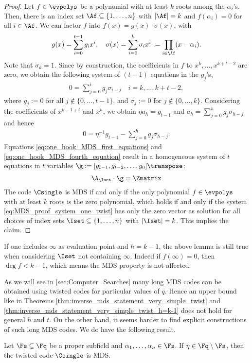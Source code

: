 \documentclass[conference,a4paper]{IEEEtran}
\begin{document}
\begin{proof}
Let $f \in \evpolys$ be a polynomial with at least $k$ roots among the $\alpha_i$'s.
Then, there is an index set $\Af \subseteq \{1,\dots,n\}$ with $|\Af|=k$ and $f(\alpha_i) = 0$ for all $i \in \Af$.
We can factor $f$ into $f(x) = g(x) \cdot \sigma(x)$, with
\begin{align*}
g(x) = \sum\limits_{i=0}^{t-1} g_i x^i, \quad
\sigma(x) = \sum\limits_{i=0}^{k} \sigma_i x^i := \prod_{i \in \Af} (x-\alpha_i).
\end{align*}
Note that $\sigma_k=1$.
Since by construction, the coefficients in $f$ to $x^k, \ldots, x^{k+t-2}$ are zero, we obtain the following system of $(t-1)$ equations in the $g_j$'s,
\begin{align}
0 = \sum\limits_{j=0}^{i} g_j \sigma_{i-j} \quad i=k,\dots,k+t-2, \label{eq:one_hook_MDS_first_equations}
\end{align}
where $g_j := 0$ for all $j \notin \{ 0,\ldots, t-1 \}$, and $\sigma_j:=0$ for $j \notin \{0,\ldots,k\}$.
Considering the coefficients of $x^{k-1+t}$ and $x^h$, we obtain
$\eta a_h   = g_{t-1}$ and $a_h  = \sum_{j=0}^{h} g_j \sigma_{h-j}$
and hence
\begin{align}
0 = \eta^{-1} g_{t-1} -\sum\limits_{j=0}^{h} g_j \sigma_{h-j}. \label{eq:one_hook_MDS_fourth_equation}
\end{align}
Equations \eqref{eq:one_hook_MDS_first_equations} and \eqref{eq:one_hook_MDS_fourth_equation} result in a homogeneous system of $t$ equations in $t$ variables $\g := [g_{t-1},g_{t-2},\dots,g_{0}]\transpose$:
\begin{align}
\A_\Iset \cdot \g
=
\Zmatrix \label{eq:MDS_proof_system_one_twist}
\end{align}
The code $\Csingle$ is MDS if and only if the only polynomial $f \in \evpolys$ with at least $k$ roots is the zero polynomial, which holds if and only if the system \eqref{eq:MDS_proof_system_one_twist} has only the zero vector as solution for all choices of index sets $\Iset \subseteq \{1,\dots,n\}$ with $|\Iset|=k$. This implies the claim.
\end{proof}

\begin{remark}
If one includes $\infty$ as evaluation point and $h=k-1$, the above lemma is still true when considering $\Iset$ not containing $\infty$. Indeed if $f(\infty)=0$, then $\deg f < k-1$, which means the MDS property is not affected.
\end{remark}

As we will see in \cref{sec:Computer_Searches} many long MDS codes can be obtained using twisted codes for particular values of $q$. Hence an upper bound like in Theorems \ref{thm:inverse_mds_statement_very_simple_twist} and \ref{thm:inverse_mds_statement_very_simple_twist_h=k-1} does not hold for general $h$ and $t$.
On the other hand, it seems harder to find explicit constructions of such long MDS codes.
We do have the following result.
\begin{theorem}\label{thm:MDS_property_one_twist}
Let $\Fs \subsetneq \Fq$ be a proper subfield and $\alpha_1,\dots,\alpha_n \in \Fs$.
If $\eta \in \Fq \setminus \Fs$, then the twisted code $\Csingle$ is MDS.
\end{theorem}
\end{document}
